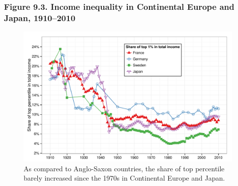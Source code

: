 \documentclass[t]{beamer}\usepackage[]{graphicx}\usepackage[]{color}
\newenvironment{knitrout}{}{} %
\begin{document}
\begin{frame}[label=Figure_9_3]
\frametitle{Figure 9.3. Income inequality in Continental Europe and Japan, 1910--2010}
\begin{figure}[t]
\begin{minipage}[b]{\textwidth}
\centering
\begin{knitrout}\footnotesize
{}\color{fgcolor}

{\centering \includegraphics[width=1\linewidth]{figures/color/Figure_9_3} 

}



\end{knitrout}
\caption{As compared to Anglo-Saxon countries, the share of top percentile barely increased since the 1970s in Continental Europe and Japan.}
\end{minipage}
\end{figure}
\end{frame}
\end{document}
